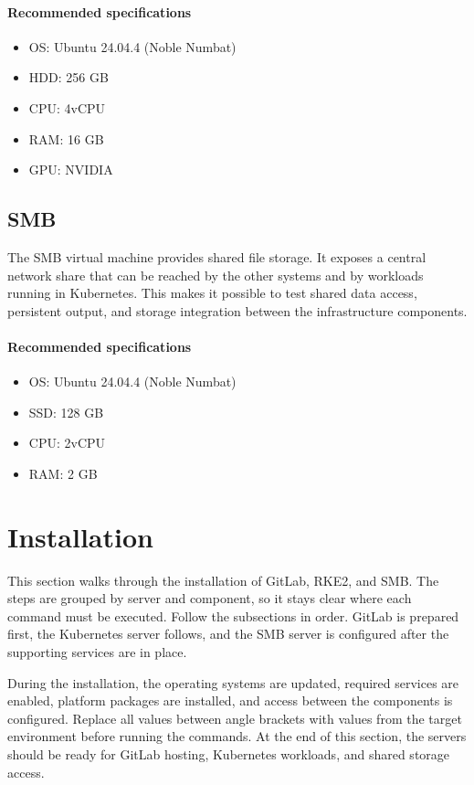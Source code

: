 \documentclass{article}
\begin{document}
\paragraph{Recommended specifications}
\begin{itemize}
	\item OS: Ubuntu 24.04.4 (Noble Numbat)
	\item HDD: 256 GB
	\item CPU: 4vCPU
	\item RAM: 16 GB
	\item GPU: NVIDIA
\end{itemize}

\subsection{SMB}

The SMB virtual machine provides shared file storage. It exposes a central network share that can be reached by the other systems and by workloads running in Kubernetes. This makes it possible to test shared data access, persistent output, and storage integration between the infrastructure components.

\paragraph{Recommended specifications}
\begin{itemize}
	\item OS: Ubuntu 24.04.4 (Noble Numbat)
	\item SSD: 128 GB
	\item CPU: 2vCPU
	\item RAM: 2 GB
\end{itemize}

\newpage
\section{Installation}

This section walks through the installation of GitLab, RKE2, and SMB. The steps are grouped by server and component, so it stays clear where each command must be executed. Follow the subsections in order. GitLab is prepared first, the Kubernetes server follows, and the SMB server is configured after the supporting services are in place.

\vspace{0.5cm}

During the installation, the operating systems are updated, required services are enabled, platform packages are installed, and access between the components is configured. Replace all values between angle brackets with values from the target environment before running the commands. At the end of this section, the servers should be ready for GitLab hosting, Kubernetes workloads, and shared storage access.
\end{document}
